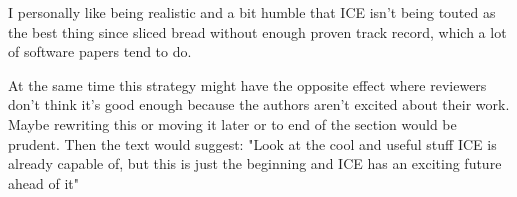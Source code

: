 I personally like being realistic and a bit humble that ICE isn't being touted as the best thing since sliced bread without enough proven track record, which a lot of software papers tend to do. 

At the same time this strategy might have the opposite effect where reviewers don't think it's good enough because the authors aren't excited about their work. Maybe rewriting this or moving it later or to end of the section would be prudent. Then the text would suggest: "Look at the cool and useful stuff ICE is already capable of, but this is just the beginning and ICE has an exciting future ahead of it"